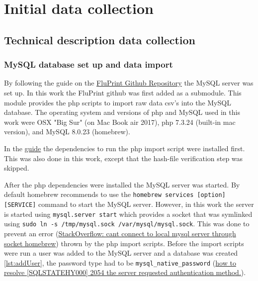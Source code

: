 

\makeglossaries





\tableofcontents
\printglossary[type=bus]
\printglossary[type=dm]
\printglossary[type=\acronymtype]

\section{Initial data collection}

\subsection{Technical description data collection}

\subsubsection{MySQL database set up and data import}

By following the guide on the
\href{https://github.com/LogIN-/fluprint}{FluPrint Github Repository} the MySQL
server was set up. In this work the FluPrint github was first added as a
submodule. This module provides the php scripts to import raw data csv's into
the MySQL database. The operating system and versions of php and MySQL used in
this work were OSX "Big Sur" (on Mac Book air 2017), php 7.3.24 (built-in mac
version), and MySQL 8.0.23 (homebrew).

In the \href{https://github.com/LogIN-/fluprint}{guide} the dependencies to run
the php import script were installed first. This was also done in this work,
except that the hash-file verification step was skipped.

After the php dependencies were installed the MySQL server was started. By
default homebrew recommends to use the \lstinline{homebrew services [option] [SERVICE]} command to start the MySQL server. However, in this work the server
is started using \lstinline{mysql.server start} which provides a socket that
was symlinked using \lstinline{sudo ln -s /tmp/mysql.sock /var/mysql/mysql.sock}. This was done to prevent an error
(\href{https://stackoverflow.com/questions/15016376/cant-connect-to-local-mysql-server-through-socket-homebrew/18090173}{StackOverflow: cant connect to local mysql server through socket homebrew}) thrown
by the php import scripts. Before the import scripts were run a user was added to the
MySQL server and a database was created \ref{lst:addUser}, the password type had to be \lstinline{mysql_native_password}
(\href{https://stackoverflow.com/questions/62873680/how-to-resolve-sqlstatehy000-2054-the-server-requested-authentication-metho}{how to resolve [SQLSTATEHY000] 2054 the server requested authentication method.}).

